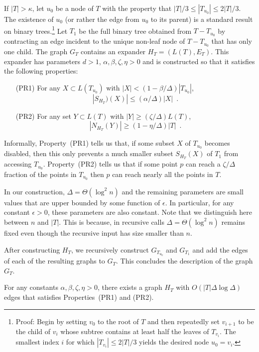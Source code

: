 \documentclass{patmorin}
\begin{document}
If $|T|>\kappa$, let $u_0$ be a node of $T$ with the property that
$|T|/3\le |T_{u_0}|\le 2|T|/3$.  The existence of $u_0$ (or rather
the edge from $u_0$ to its parent) is a standard result on binary
trees.\footnote{Proof: Begin by setting $v_0$ to the root of $T$ and then repeatedly set $v_{i+1}$ to be the child of $v_i$ whose subtree contains at least half the leaves of $T_{v_i}$.  The smallest index $i$ for which $|T_{v_i}|\le 2|T|/3$ yields the desired node $u_0=v_i$.}   Let $T_1$ be the full binary tree obtained from
$T-T_{u_0}$ by contracting an edge incident to the unique non-leaf node
of $T-T_{u_0}$ that has only one child.  The graph $G_{T}$ contains
an expander $H_T=(L(T),E_T)$. This expander has parameters $d>1$,
$\alpha, \beta,\zeta,\eta > 0$ and is constructed so that it satisfies
the following properties:
\begin{enumerate}
  \item[(PR1)] For any $X\subset L(T_{u_0})$ with
    $|X|<(1-\beta/\Delta)|T_{u_0}|$, 
    \[ |S_{H_T})(X)|\le (\alpha/\Delta)|X| \enspace . \]

  \item[(PR2)] For any set $Y\subset L(T)$ with $|Y|\ge
    (\zeta/\Delta)L(T)$, \[ |N_{H_T}(Y)|\ge (1-\eta/\Delta)|T| \enspace .\]
\end{enumerate}
Informally, Property~(PR1) tells us that, if some subset $X$
of $T_{u_0}$ becomes disabled, then this only prevents a much smaller
subset $S_{H_T}(X)$ of $T_{1}$ from accessing $T_{u_0}$.  Property~(PR2)
tells us that if some point $p$ can reach a $\zeta/\Delta$ fraction of
the points in $T_{u_0}$ then $p$ can reach nearly
all the points in $T$.

In our construction, $\Delta=\Theta(\log^2 n)$ and the remaining
parameters are small values that are upper bounded by some function
of $\epsilon$. In particular, for any constant $\epsilon >0$, these
parameters are also constant. Note that we distinguish here between $n$
and $|T|$. This is because, in recursive calls $\Delta=\Theta(\log^2 n)$
remains fixed even though the recursive input has size smaller than $n$.

After constructing $H_T$, we recursively construct $G_{T_{u_0}}$
and $G_{T_1}$ and add the edges of each of the resulting graphs to
$G_{T}$. This concludes the description of the graph $G_T$.

\begin{clm}
  For any constants $\alpha,\beta,\zeta,\eta>0$, there exists a graph $H_T$ with
  $O(|T|\Delta\log\Delta)$ edges that satisfies Properties~(PR1) and (PR2).
\end{clm}
\end{document}
